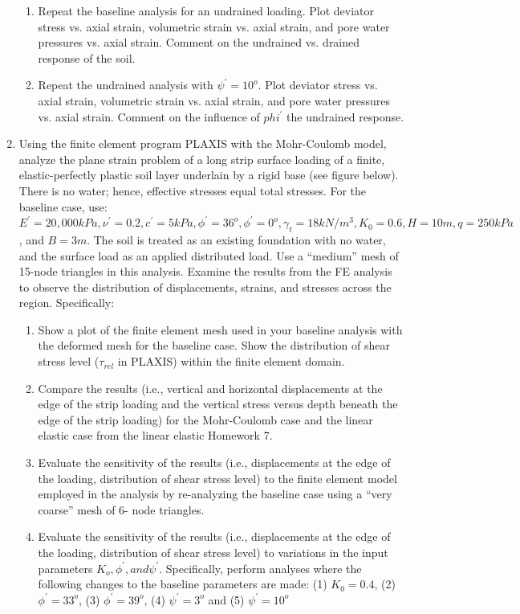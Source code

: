 \documentclass[a4paper,12pt]{article}
\begin{document}
\begin{enumerate}
\begin{enumerate}
		\item Repeat the baseline analysis for an undrained loading. Plot deviator stress vs. axial strain, volumetric strain vs. axial strain, and pore water pressures vs. axial strain. Comment on the undrained vs. drained response of the soil.
		\item Repeat the undrained analysis with $\psi^\prime = 10^o$. Plot deviator stress vs. axial strain,
		volumetric strain vs. axial strain, and pore water pressures vs. axial strain. Comment
		on the influence of $phi^\prime$ the undrained response.
	\end{enumerate}
	
	\item Using the finite element program PLAXIS with the Mohr-Coulomb model, analyze the plane
	strain problem of a long strip surface loading of a finite, elastic-perfectly plastic soil layer
	underlain by a rigid base (see figure below). There is no water; hence, effective stresses
	equal total stresses. For the baseline case, use: $E^\prime = 20,000 kPa, \nu^\prime = 0.2, c^\prime = 5 kPa, \phi^\prime = 36^o, \phi^\prime = 0^o, \gamma_t = 18 kN/m^3, K_0 = 0.6, H = 10m, q = 250 kPa$, and $B = 3 m$.  The soil is treated as an
	existing foundation with no water, and the surface load as an applied distributed load. Use a
	``medium'' mesh of 15-node triangles in this analysis. Examine the results from the FE
	analysis to observe the distribution of displacements, strains, and stresses across the region.	Specifically:
	
	\begin{enumerate}
		\item Show a plot of the finite element mesh used in your baseline analysis with the deformed mesh for the baseline case. Show the
		distribution of shear stress level ($\tau_{rel}$ in PLAXIS) within the finite element domain.
		\item Compare the results (i.e., vertical and horizontal displacements at the edge of the
		strip loading and the vertical stress versus depth beneath the edge of the strip
		loading) for the Mohr-Coulomb case and the linear elastic case from the linear elastic Homework 7.
		\item Evaluate the sensitivity of the results (i.e., displacements at the edge of the
		loading, distribution of shear stress level) to the finite element model employed in
		the analysis by re-analyzing the baseline case using a ``very coarse'' mesh of 6-
		node triangles.
		\item Evaluate the sensitivity of the results (i.e., displacements at the edge of the
		loading, distribution of shear stress level) to variations in the input parameters
		$K_o, \phi^\prime, and \psi^\prime$. Specifically, perform analyses where the following changes to the
		baseline parameters are made: (1) $K_0 = 0.4$, (2) $\phi^\prime = 33^o$, (3) $\phi^\prime = 39^o$, (4) $\psi^\prime = 3^o$ and (5) $\psi^\prime = 10^o$
	\end{enumerate}


\end{enumerate}
\end{document}
